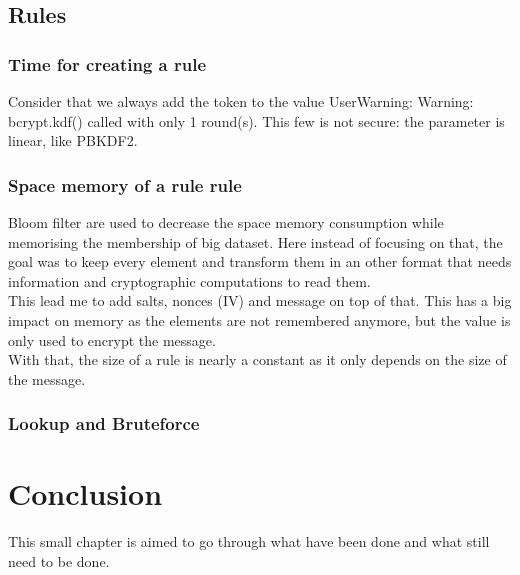 \documentclass{eplmastersthesis}
\begin{document}
\section{Rules}

\subsection{Time for creating a rule}
Consider that we always add the token to the value
UserWarning: Warning: bcrypt.kdf() called with only 1 round(s). This few is not secure: the parameter is linear, like PBKDF2.
\subsection{Space memory of a rule rule}
Bloom filter are used to decrease the space memory consumption while memorising the membership of big dataset. Here instead of focusing on that, the goal was to keep every element and transform them in an other format that needs information and cryptographic computations to read them.\\

This lead me to add salts, nonces (IV) and message on top of that. This has a big impact on memory as the elements are not remembered anymore, but the value is only used to encrypt the message.\\
With that, the size of a rule is nearly a constant as it only depends on the size of the message.


\subsection{Lookup and Bruteforce}


\chapter{Conclusion}

This small chapter is aimed to go through what have been done and what still need to be done.
\end{document}
